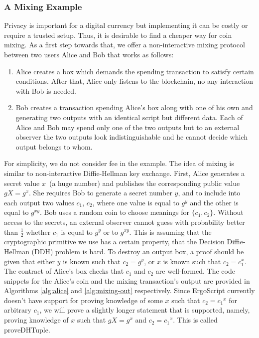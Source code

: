 \subsubsection{A Mixing Example}
 \label{sec:platform}

 Privacy is important for a digital currency but implementing it can be costly or require a trusted setup. Thus, it is desirable to find a cheaper way for coin mixing. As a first step towards that, we offer a non-interactive mixing protocol between two users Alice and Bob that works as follows:
 \begin{enumerate}
    \item{} Alice creates a box which demands the spending transaction to satisfy certain conditions. After that, Alice only listens to the blockchain, no any interaction with Bob is needed.
    \item{} Bob creates a transaction spending Alice's box along with one of his own and generating two outputs with an identical script but different data. Each of Alice and Bob may spend only one of the two outputs but to an external observer the two outputs look indistinguishable and he cannot decide which output belongs to whom.
 \end{enumerate}

 For simplicity, we do not consider fee in the example. The idea of mixing is similar to non-interactive Diffie-Hellman key exchange. First, Alice generates a secret value $x$~(a huge number) and publishes the corresponding public value $gX = g^x$. She requires Bob to generate a secret number $y$, and to include into each output two
 values $c_1$, $c_2$, where one value is equal to $g^y$ and the other is equal to $g^{xy}$. Bob uses a random coin to choose meanings for $\{c_1, c_2\}$. Without access to the secrets, an external observer cannot guess with probability better than  $\frac{1}{2}$ whether $c_1$ is equal to $g^y$ or to $g^{xy}$. This is assuming that the cryptographic primitive we use has a certain property, that the Decision Diffie-Hellman (DDH) problem is hard. To destroy an output box, a proof should be given that either $y$ is known such that $c_2 = g^y$, or $x$ is known such that $c_2 = c_1^x$.
 The contract of Alice's box checks that $c_1$ and $c_2$ are well-formed. The code snippets for the Alice's coin and the mixing transaction's output are provided in Algorithms \ref{alg:alice} and \ref{alg:mixing-out} respectively. Since ErgoScript currently doesn't have support for proving knowledge of some $x$ such that $c_2 = {c_1}^x$ for arbitrary $c_1$,  we will prove a slightly longer statement that is supported, namely, proving knowledge of $x$ such that $gX = g^x$ and $c_2 = {c_1}^x$. This is called proveDHTuple.

